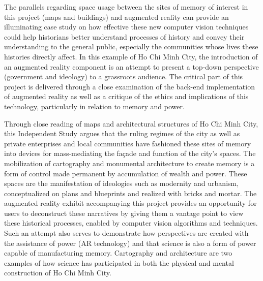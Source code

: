 The parallels regarding space usage between the sites of memory of interest in this project (maps and buildings) and augmented reality can provide an illuminating case study on how effective these new computer vision techniques could help historians better understand processes of history and convey their understanding to the general public, especially the communities whose lives these histories directly affect. In this example of Ho Chi Minh City, the introduction of an augmented reality component is an attempt to present a top-down perspective (government and ideology) to a grassroots audience. The critical part of this project is delivered through a close examination of the back-end implementation of augmented reality as well as a critique of the ethics and implications of this technology, particularly in relation to memory and power.

Through close reading of maps and architectural structures of Ho Chi Minh City, this Independent Study argues that the ruling regimes of the city as well as private enterprises and local communities have fashioned these sites of memory into devices for mass-mediating the façade and function of the city’s spaces. The mobilization of cartography and monumental architecture to create memory is a form of control made permanent by accumulation of wealth and power. These spaces are the manifestation of ideologies such as modernity and urbanism, conceptualized on plans and blueprints and realized with bricks and mortar. The augmented reality exhibit accompanying this project provides an opportunity for users to deconstruct these narratives by giving them a vantage point to view these historical processes, enabled by computer vision algorithms and techniques. Such an attempt also serves to demonstrate how perspectives are created with the assistance of power (AR technology) and that science is also a form of power capable of manufacturing memory. Cartography and architecture are two examples of how science has participated in both the physical and mental construction of Ho Chi Minh City.

